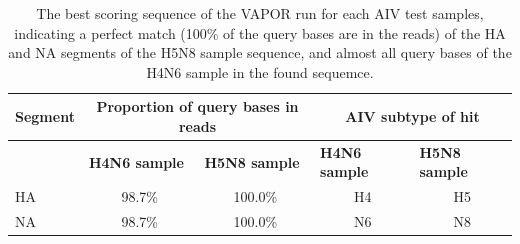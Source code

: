 \setlength{\tabcolsep}{8pt}
\renewcommand{\arraystretch}{1.3}
\begin{table}[ht!]
    \centering
    \hspace*{-16pt}
    \begin{tabular}{@{}lcccc@{}}
    \toprule
    \multicolumn{1}{l}{\textbf{Segment}} & \multicolumn{2}{c}{\textbf{Proportion of query bases in reads}}                             & \multicolumn{2}{c}{\textbf{AIV subtype of hit}}                                         \\ \midrule
                                         & \multicolumn{1}{l}{\textbf{H4N6 sample}} & \multicolumn{1}{l}{\textbf{H5N8 sample}} & \multicolumn{1}{l}{\textbf{H4N6 sample}} & \multicolumn{1}{l}{\textbf{H5N8 sample}} \\ \cmidrule(l){2-5} 
    HA                                   & 98.7\%                                    & 100.0\%                                      & H4                                       & H5                                       \\
    NA                                   & 98.7\%                                    & 100.0\%                                      & N6                                       & N8                                       \\ \bottomrule
    \end{tabular}
    \caption[Results of VAPOR run with AIV test samples.]{The best scoring sequence of the VAPOR run for each AIV test samples, indicating a perfect match (100\% of the query bases are in the reads) of the HA and NA segments of the H5N8 sample sequence, and almost all query bases of the H4N6 sample in the found sequemce.}    
\label{tab:4-aiv-vapor}
\end{table}

